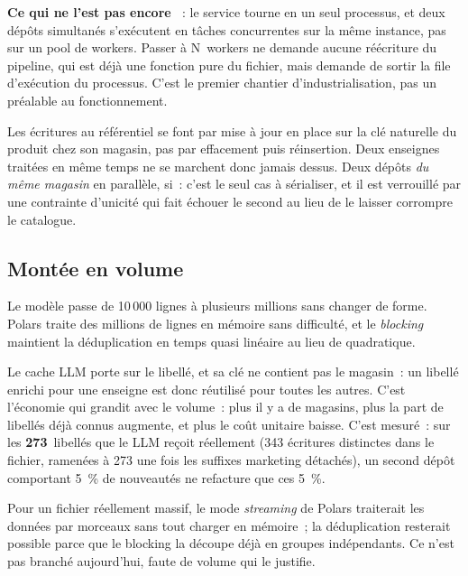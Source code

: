 \documentclass[11pt,a4paper]{article}
\newcommand{\pa}{\textcolor{amber}{\small\ding{108}}}
\begin{document}
\textbf{Ce qui ne l'est pas encore \pa{}}~: le service tourne en un seul processus, et deux dépôts
simultanés s'exécutent en tâches concurrentes sur la même instance, pas sur un pool de workers.
Passer à N~workers ne demande aucune réécriture du pipeline, qui est déjà une fonction pure du
fichier, mais demande de sortir la file d'exécution du processus. C'est le premier chantier
d'industrialisation, pas un préalable au fonctionnement.

Les écritures au référentiel se font par mise à jour en place sur la clé naturelle du produit chez
son magasin, pas par effacement puis réinsertion. Deux enseignes traitées en même temps ne se
marchent donc jamais dessus. Deux dépôts \emph{du même magasin} en parallèle, si~: c'est le seul cas
à sérialiser, et il est verrouillé par une contrainte d'unicité qui fait échouer le second au lieu
de le laisser corrompre le catalogue.

\subsection{Montée en volume}
Le modèle passe de 10\,000 lignes à plusieurs millions sans changer de forme. Polars traite des
millions de lignes en mémoire sans difficulté, et le \emph{blocking} maintient la déduplication en
temps quasi linéaire au lieu de quadratique.

Le cache LLM porte sur le libellé, et sa clé ne contient pas le magasin~: un libellé enrichi pour
une enseigne est donc réutilisé pour toutes les autres. C'est l'économie qui grandit avec le
volume~: plus il y a de magasins, plus la part de libellés déjà connus augmente, et plus le coût
unitaire baisse. C'est mesuré~: sur les \textbf{273}~libellés que le LLM reçoit réellement (343 écritures
distinctes dans le fichier, ramenées à 273 une fois les suffixes marketing détachés), un second
dépôt comportant 5~\% de nouveautés ne refacture que ces 5~\%.

\pa{} Pour un fichier réellement massif, le mode \emph{streaming} de Polars traiterait les données
par morceaux sans tout charger en mémoire~; la déduplication resterait possible parce que le
blocking la découpe déjà en groupes indépendants. Ce n'est pas branché aujourd'hui, faute de
volume qui le justifie.
\end{document}
